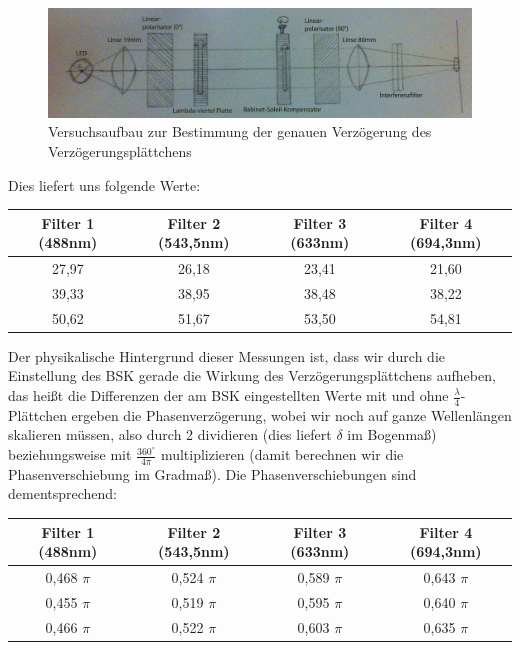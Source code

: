 \documentclass[bigchapter,colorback,accentcolor=tud4b,linedtoc,11pt]{tudreport}
\begin{document}
\begin{figure}[ht!]
\centering
\includegraphics[width=150mm]{img/skizzen/versuch_c_2.jpg}
\caption{Versuchsaufbau zur Bestimmung der genauen Verzögerung des Verzögerungsplättchens}
\end{figure}

Dies liefert uns folgende Werte:

\begin{center}
  \begin{tabular}{|c|c|c|c|}
    \hline
        Filter 1 (488nm) & Filter 2 (543,5nm) & Filter 3 (633nm) & Filter 4 (694,3nm) \\ \hline
        27,97 & 26,18 & 23,41 & 21,60 \\ \hline
        39,33 & 38,95 & 38,48 & 38,22 \\ \hline
        50,62 & 51,67 & 53,50 & 54,81 \\ \hline
	\end{tabular}
\end{center}


Der physikalische Hintergrund dieser Messungen ist, dass wir durch die Einstellung des BSK gerade die Wirkung des Verzögerungsplättchens aufheben, das heißt die Differenzen der am BSK eingestellten Werte mit und ohne  $\frac{\lambda}{4}$-Plättchen ergeben die Phasenverzögerung, wobei wir noch auf ganze Wellenlängen skalieren müssen, also durch 2 dividieren (dies liefert $\delta$ im Bogenmaß) beziehungsweise mit $\frac{360^\circ}{4\pi}$ multiplizieren (damit berechnen wir die Phasenverschiebung im Gradmaß). Die Phasenverschiebungen sind dementsprechend: 

\begin{center}
  \begin{tabular}{|c|c|c|c|}
    \hline
        Filter 1 (488nm) & Filter 2 (543,5nm) & Filter 3 (633nm) & Filter 4 (694,3nm) \\ \hline
        0,468 $\pi$ & 0,524 $\pi$ & 0,589 $\pi$ & 0,643 $\pi$ \\ \hline
        0,455 $\pi$ & 0,519 $\pi$ & 0,595 $\pi$ & 0,640 $\pi$ \\ \hline
        0,466 $\pi$ & 0,522 $\pi$ & 0,603 $\pi$ & 0,635 $\pi$ \\ \hline
	\end{tabular}
\end{center}
\end{document}
